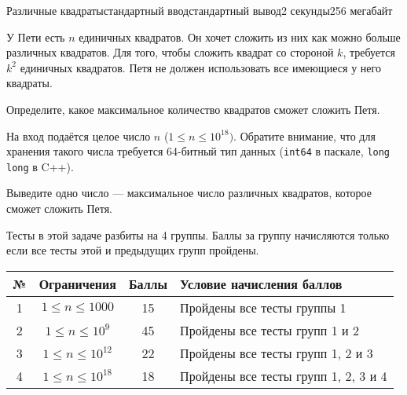 \begin{problem}{Различные квадраты}{стандартный ввод}{стандартный вывод}{2 секунды}{256 мегабайт}

У Пети есть $n$ единичных квадратов. Он хочет сложить из них как можно больше различных квадратов. Для того, чтобы сложить квадрат со стороной $k$, требуется $k^2$ единичных квадратов. Петя не должен использовать все имеющиеся у него квадраты.

Определите, какое максимальное количество квадратов сможет сложить Петя.

\InputFile
На вход подаётся целое число $n$ ($1 \le n \le 10^{18})$. Обратите внимание, что для хранения такого числа требуется 64-битный тип данных (\texttt{int64} в паскале, \texttt{long long} в C++).

\OutputFile
Выведите одно число --- максимальное число различных квадратов, которое сможет сложить Петя.

\Scoring
Тесты в этой задаче разбиты на 4 группы. Баллы за группу начисляются только если все тесты этой и предыдущих групп пройдены.
\medskip

\begin{tabular}{|c|c|c|l|}
\hline
№ & Ограничения & Баллы & Условие начисления баллов\\
\hline
1 & $1 \le n \le 1000$& 15 & Пройдены все тесты группы 1\\
\hline
2 & $1 \le n \le 10^9$& 45 & Пройдены все тесты групп 1 и 2\\
\hline
3 & $1 \le n \le 10^{12}$ & 22 & Пройдены все тесты групп 1, 2 и 3\\
\hline
4 & $1 \le n \le 10^{18}$& 18 & Пройдены все тесты групп 1, 2, 3 и 4\\
\hline
\end{tabular}

\Example

\begin{example}
%
\end{example}

\end{problem}

